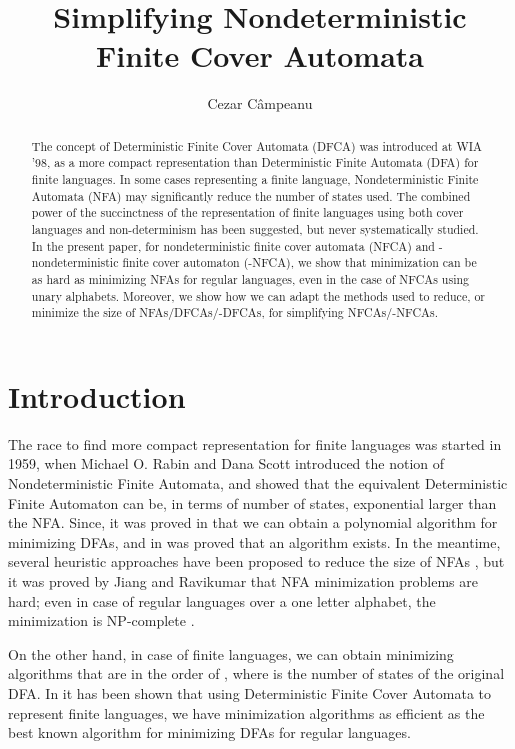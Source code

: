 \documentclass[submission,copyright,creativecommons]{eptcs}
\title{Simplifying Nondeterministic Finite Cover Automata}
\author{Cezar C\^ampeanu
\institute{Department of Computer Science and Information Technology,\\
The University of Prince Edward Island, Canada}
\email{\quad ccampeanu@upei.ca}
}
\begin{document}
\sloppy

\maketitle
\begin{abstract}
The concept of Deterministic Finite Cover Automata (DFCA) was introduced at WIA '98, 
as a more compact representation than Deterministic Finite Automata (DFA) for finite languages.
In some cases representing a finite language, Nondeterministic Finite Automata (NFA) may 
significantly reduce  the number of states used. 
The combined power of the succinctness of the representation of finite languages using 
both cover languages and non-determinism has been suggested, but never  systematically studied. 
In the present paper, for  nondeterministic finite cover automata (NFCA) and -nondeterministic 
finite cover automaton (-NFCA), we show that minimization can be as hard as minimizing NFAs for regular languages, 
even in the case of NFCAs using unary alphabets. Moreover, we show how we can adapt the 
methods used to reduce, or minimize the size of NFAs/DFCAs/-DFCAs, for simplifying NFCAs/-NFCAs.
\end{abstract}
\section{Introduction}

The race to find more compact representation for finite languages was started in 1959, 
when Michael O. Rabin and Dana Scott introduced the notion of Nondeterministic Finite Automata, 
and showed that the equivalent Deterministic Finite Automaton can be, 
in terms of number of states,  exponential larger than the NFA.
Since, it was proved in \cite{moore} that  we can obtain a polynomial algorithm for minimizing
DFAs, and in \cite{hopcroft} was proved that an  algorithm exists.
In the meantime, several heuristic approaches have been proposed to reduce 
the size of NFAs \cite{heuristic,ilieYunfa}, but it was proved by 
Jiang and  Ravikumar \cite{ravikumar} that  NFA minimization problems are
hard; even in case of regular languages over a one letter alphabet, 
the minimization is NP-complete \cite{GruberHolzerNFAHard,ravikumar}.

On the other hand, in case of finite languages, we can obtain minimizing algorithms \cite{maslov,revuz} 
that are in the order of , where  is the number of states of the original DFA.
In \cite{gapIJFCS,CoverAutomata,KornerGoeman} it has been shown that 
using Deterministic Finite Cover Automata to represent finite languages,
we have minimization algorithms as efficient as the best known algorithm for minimizing DFAs 
for regular languages. 
\end{document}
